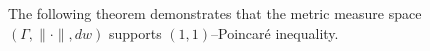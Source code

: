 \documentclass[12pt]{amsart}
\begin{document}
%
The following theorem demonstrates that the metric measure space $(\Gamma,\|\cdot\|,dw)$ supports $(1,1)$--Poincar\'e inequality.
\end{document}
